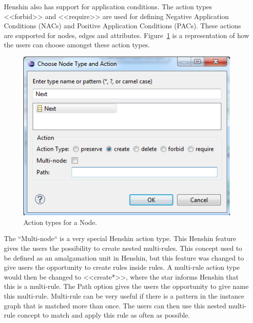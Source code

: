 \documentclass[pdftex,11pt,a4paper]{article}
\begin{document}
Henshin also has support for application conditions. The action types <<forbid>>
and <<require>> are used for defining Negative Application Conditions (NACs)
and Positive Application Conditions (PACs). These actions are supported for
nodes, edges and attributes. Figure~\ref{fig:HenshinAction} is a representation
of how the users can choose amongst these action types.  

\begin{figure}[H]
	\centering
	\includegraphics[scale=0.5]{figures/Henshin_Action.png}
	\caption{Action types for a Node.}
	\label{fig:HenshinAction}
\end{figure}

The ``Multi-node`` is a very special Henshin action type. This Henshin
feature gives the users the possibility to create nested multi-rules. This
concept used to be defined as an amalgamation unit in Henshin, but this feature
was changed to give users the opportunity to create rules inside rules. A
multi-rule action type would then be changed to <<create*>>, where the star
informs Henshin that this is a multi-rule. The Path option gives the users
the opportunity to give name this multi-rule. Multi-rule can be very useful if
there is a pattern in the instance graph that is matched more than once. The
users can then use this nested multi-rule concept to match and apply this rule
as often as possible.
\end{document}
